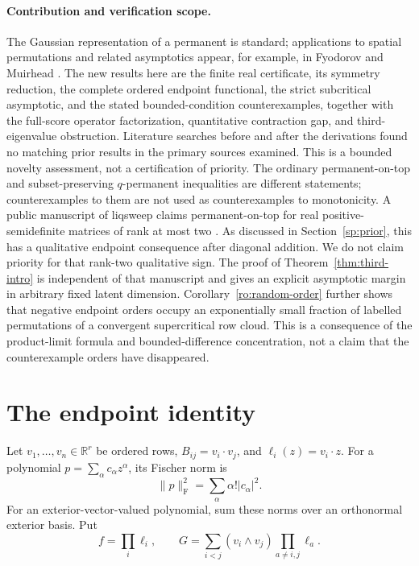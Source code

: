 \documentclass[11pt]{article}
\theoremstyle{remark}\newtheorem{remark}[theorem]{Remark}
\newcommand{\R}{\mathbb R}
\newcommand{\F}{\mathrm F}
\begin{document}
\paragraph{Contribution and verification scope.}
The Gaussian representation of a permanent is standard; applications
to spatial permutations and related asymptotics appear, for example,
in Fyodorov and Muirhead \cite{FyodorovMuirhead2021}. The new results here
are the finite real certificate, its symmetry reduction, the complete
ordered endpoint functional, the strict subcritical asymptotic, and
the stated bounded-condition counterexamples, together with the full-score
operator factorization, quantitative contraction gap, and third-eigenvalue
obstruction. Literature searches
before and after the derivations found no matching prior results in
the primary sources examined. This is a bounded novelty assessment,
not a certification of priority.
The ordinary permanent-on-top and subset-preserving $q$-permanent
inequalities are different statements; counterexamples to them are
not used as counterexamples to monotonicity.
A public manuscript of liqsweep claims permanent-on-top for real
positive-semidefinite matrices of rank at most two \cite{Liqsweep2026}.
As discussed in Section~\ref{sp:prior}, this has a qualitative endpoint
consequence after diagonal addition. We do not claim priority for that
rank-two qualitative sign. The proof of Theorem~\ref{thm:third-intro}
is independent of that manuscript and gives an explicit asymptotic
margin in arbitrary fixed latent dimension.
Corollary~\ref{ro:random-order} further shows that negative endpoint
orders occupy an exponentially small fraction of labelled permutations
of a convergent supercritical row cloud. This is a consequence of the
product-limit formula and bounded-difference concentration, not a claim
that the counterexample orders have disappeared.

\section{The endpoint identity}\label{sec:endpoint}

Let $v_1,\ldots,v_n\in\R^r$ be ordered rows, $B_{ij}=v_i\cdot v_j$,
and $\ell_i(z)=v_i\cdot z$. For a polynomial $p=\sum_\alpha c_\alpha z^\alpha$,
its Fischer norm is
\[
 \|p\|_{\F}^2=\sum_\alpha\alpha!|c_\alpha|^2.
\]
For an exterior-vector-valued polynomial, sum these norms over an
orthonormal exterior basis. Put
\[
 f=\prod_i\ell_i,\qquad
 G=\sum_{i<j}(v_i\wedge v_j)\prod_{a\ne i,j}\ell_a.
\]
\end{document}
